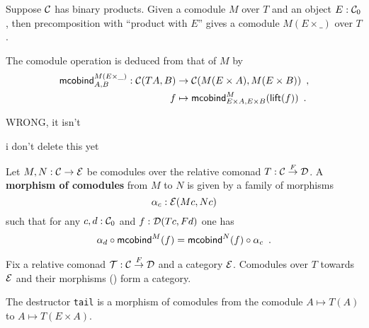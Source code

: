 \documentclass{amsart}
\newcommand{\fat}[1]{\textbf{#1}}
\begin{document}
\begin{definition}
 Suppose $\C$ has binary products.
 Given a comodule $M$ over $T$ and an object $E:\C_0$, then precomposition with \enquote{product with $E$}
 gives a comodule $M(E\times\_)$ over $T$.
 
 The comodule operation is deduced from that of $M$ by 
 \begin{align*} \mcobind^{M(E\times\_)}_{A,B} : \C(TA,B)&\to \C(M(E\times A), M(E\times B)) \enspace ,\\
                                                      f &\mapsto \mcobind^M_{E\times A,E\times B}(\lift(f)) \enspace .
  \end{align*}                                        
 
 
\end{definition}

\begin{definition}

  WRONG, it isn't 
  
  i don't delete this yet

 
 
\end{definition}


\begin{definition}\label{def:morphism_of_comodules}
 
 Let $M, N : \C \to \E$ be comodules over the relative comonad $T : \C \stackrel{F}{\to} \D$.
 A \fat{morphism of comodules} from $M$ to $N$ is given by a family of morphisms 
   \[ \alpha_c:\E(Mc,Nc) \]
 such that for any $c,d:\C_0$ and $f : \D(Tc,Fd)$ one has
 \[   \comp{\mcobind^M(f)}{\alpha_d} = \comp{\alpha_c}{\mcobind^N(f)} \enspace . \]
 
\end{definition}

\begin{remark}
 Fix a relative comonad $\T : \C\stackrel{F}{\to}\D$ and a category $\E$.
 Comodules over $T$ towards $\E$ and their morphisms () form a category.
\end{remark}


\begin{example}
 The destructor \lstinline!tail! is a morphism of comodules from the comodule $A \mapsto T(A)$ to $A\mapsto T(E\times A)$.
\end{example}
\end{document}
